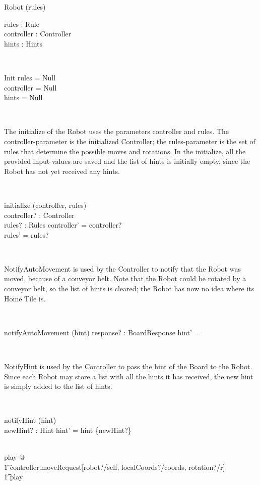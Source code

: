 \documentclass[12pt]{article}
\begin{document}
\begin{class}{Robot}
\upharpoonright (rules) \\
\begin{state}
rules : Rule \\
controller : Controller \\
hints : \power Hints
\end{state}\\
\begin{schema}{Init}
rules = Null \\
controller = Null \\
hints = Null
\end{schema} \\
\begin{zpar}
The initialize of the Robot uses the parameters controller and rules. The controller-parameter is the initialized Controller; the rules-parameter is the set of rules that determine the possible moves and rotations. In the initialize, all the provided input-values are saved and the list of hints is initially empty, since the Robot has not yet received any hints.
\end{zpar} \\
\begin{schema}{initialize}
\Delta (controller, rules) \\
controller? : Controller \\
rules? : Rules
\where
controller' = controller? \\
rules' = rules?
\end{schema} \\
\begin{zpar}
NotifyAutoMovement is used by the Controller to notify that the Robot was moved, because of a conveyor belt. Note that the Robot could be rotated by a conveyor belt, so the list of hints is cleared; the Robot has now no idea where its Home Tile is.
\end{zpar} \\
\begin{schema}{notifyAutoMovement}
\Delta (hint)
response? : BoardResponse
\where
hint' = \emptyset
\end{schema}\\
\begin{zpar}
NotifyHint is used by the Controller to pass the hint of the Board to the Robot. Since each Robot may store a list with all the hints it has received, the new hint is simply added to the list of hints.
\end{zpar} \\
\begin{schema}{notifyHint}
\Delta (hint) \\
newHint? : Hint
\where
hint' = hint \cup \{newHint?\}
\end{schema} \\
play  @ \\ \t1 controller.moveRequest[robot?/self, localCoords?/coords, rotation?/r] \; \; \comp \\ \t1 play
\end{class}
\end{document}
